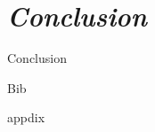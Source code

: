 \documentclass[12pt, a4paper]{report}
\begin{document}
        
        
        
        
        
        
\chapter{\textit{Conclusion}}
        
        {Conclusion}
        

        
\clearpage

{Bib}


\clearpage

\appendixpage

\appendix

{appdix}
\end{document}

